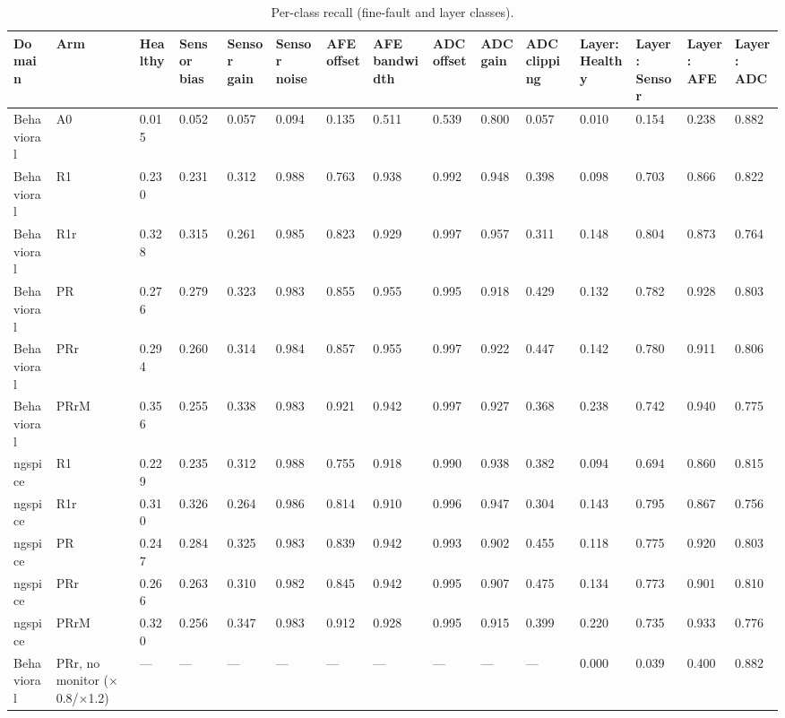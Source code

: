 \begin{table}[H]
\caption{Per-class recall (fine-fault and layer classes).\label{tab:table11_per_class_recall}}
\centering
\footnotesize
\begin{tabular}{p{3.2cm}p{1.2cm}p{1.2cm}p{1.2cm}p{1.2cm}p{1.2cm}p{1.2cm}p{1.2cm}p{1.2cm}p{1.2cm}p{1.2cm}p{1.2cm}p{1.2cm}p{1.2cm}p{1.2cm}}
\toprule
\textbf{Domain} & \textbf{Arm} & \textbf{Healthy} & \textbf{Sensor bias} & \textbf{Sensor gain} & \textbf{Sensor noise} & \textbf{AFE offset} & \textbf{AFE bandwidth} & \textbf{ADC offset} & \textbf{ADC gain} & \textbf{ADC clipping} & \textbf{Layer: Healthy} & \textbf{Layer: Sensor} & \textbf{Layer: AFE} & \textbf{Layer: ADC} \\
\midrule
Behavioral & A0 & 0.015 & 0.052 & 0.057 & 0.094 & 0.135 & 0.511 & 0.539 & 0.800 & 0.057 & 0.010 & 0.154 & 0.238 & 0.882 \\
Behavioral & R1 & 0.230 & 0.231 & 0.312 & 0.988 & 0.763 & 0.938 & 0.992 & 0.948 & 0.398 & 0.098 & 0.703 & 0.866 & 0.822 \\
Behavioral & R1r & 0.328 & 0.315 & 0.261 & 0.985 & 0.823 & 0.929 & 0.997 & 0.957 & 0.311 & 0.148 & 0.804 & 0.873 & 0.764 \\
Behavioral & PR & 0.276 & 0.279 & 0.323 & 0.983 & 0.855 & 0.955 & 0.995 & 0.918 & 0.429 & 0.132 & 0.782 & 0.928 & 0.803 \\
Behavioral & PRr & 0.294 & 0.260 & 0.314 & 0.984 & 0.857 & 0.955 & 0.997 & 0.922 & 0.447 & 0.142 & 0.780 & 0.911 & 0.806 \\
Behavioral & PRrM & 0.356 & 0.255 & 0.338 & 0.983 & 0.921 & 0.942 & 0.997 & 0.927 & 0.368 & 0.238 & 0.742 & 0.940 & 0.775 \\
ngspice & R1 & 0.229 & 0.235 & 0.312 & 0.988 & 0.755 & 0.918 & 0.990 & 0.938 & 0.382 & 0.094 & 0.694 & 0.860 & 0.815 \\
ngspice & R1r & 0.310 & 0.326 & 0.264 & 0.986 & 0.814 & 0.910 & 0.996 & 0.947 & 0.304 & 0.143 & 0.795 & 0.867 & 0.756 \\
ngspice & PR & 0.247 & 0.284 & 0.325 & 0.983 & 0.839 & 0.942 & 0.993 & 0.902 & 0.455 & 0.118 & 0.775 & 0.920 & 0.803 \\
ngspice & PRr & 0.266 & 0.263 & 0.310 & 0.982 & 0.845 & 0.942 & 0.995 & 0.907 & 0.475 & 0.134 & 0.773 & 0.901 & 0.810 \\
ngspice & PRrM & 0.320 & 0.256 & 0.347 & 0.983 & 0.912 & 0.928 & 0.995 & 0.915 & 0.399 & 0.220 & 0.735 & 0.933 & 0.776 \\
Behavioral & PRr, no monitor ($\times$0.8/$\times$1.2) & --- & --- & --- & --- & --- & --- & --- & --- & --- & 0.000 & 0.039 & 0.400 & 0.882 \\
\bottomrule
\end{tabular}
\par\vspace{2pt}
\end{table}

